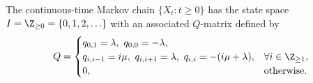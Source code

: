 \documentclass[
  coursecode={MTHE 455},
  assignmentname={Assignment \assignmentnumber},
  studentnumber=20053722,
  name={Bryan Hoang},
  draft,
]{
  ltxanswer%
}
\begin{document}
  \begin{questions}
    \setcounter{question}{\questionnumber}
    \addtocounter{question}{-1}
    \question[6]\
    \begin{parts}
      \part{}
      \begin{solution}
        The continuous-time Markov chain \(\{X_{t} : t \ge 0\}\) has the state space \(I = \Z_{\ge 0} = \{0, 1, 2, \ldots\}\) with an associated \(Q\)-matrix defined by
        \begin{equation*}
          Q = \begin{cases}
            q_{0,1} = \lambda,\ q_{0,0} = -\lambda,                                                          \\
            q_{i,i-1} = i\mu,\ q_{i,i+1} = \lambda,\ q_{i,i} = -(i\mu + \lambda), &\forall i \in \Z_{\ge 1}, \\
            0,                                                                    &\text{otherwise.}
          \end{cases}
        \end{equation*}
      \end{solution}


\end{parts}
\end{questions}
\end{document}
